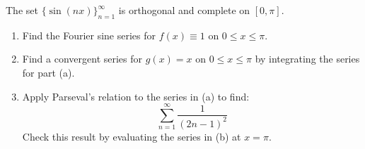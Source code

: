 {%
\begin{Exercise}
  The set $\{ \sin(n x) \}_{n=1}^\infty$ is orthogonal and complete on $[0,\pi]$.
  \begin{enumerate}
  \item
    Find the Fourier sine series for $f(x) \equiv 1$ on $0 \leq x \leq \pi$.
  \item
    Find a convergent series for $g(x) = x$ on $0 \leq x \leq \pi$ by
    integrating the series for part (a).
  \item
    Apply Parseval's relation to the series in (a) to find:
    \[
    \sum_{n = 1}^\infty \frac{1}{(2n-1)^2}
    \]
    Check this result by evaluating the series in (b) at $x = \pi$.
  \end{enumerate}
\end{Exercise}





}
